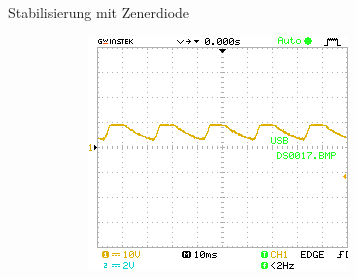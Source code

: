 \documentclass{article}
\theoremstyle{definition}
\begin{document}
\begin{aufgabe}{Stabilisierung mit Zenerdiode}
\begin{figure}[h!]
\begin{subfigure}[b]{0.45\textwidth}
        \includegraphics[width=\textwidth]{MesswerteVersuch2/DS0017.png}
      
    \end{subfigure}

    \vspace{0.5cm} %


\end{figure}
\end{aufgabe}
\end{document}

